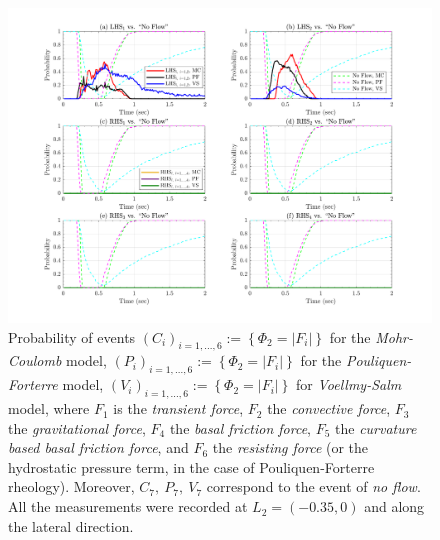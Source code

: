 \documentclass{article}
\begin{document}
\begin{figure}[H]
        \centering
        \includegraphics[width=1\textwidth]{InclinedPlane/LocalRecords/DominancePrY_L2.png}
        \caption{Probability of events $(C_i)_{i=1,...,6}:=\left\{\Phi_2=|F_i|\right\}$ for the \emph{Mohr-Coulomb} model, $(P_i)_{i=1,...,6}:=\left\{\Phi_2=|F_i|\right\}$ for the \emph{Pouliquen-Forterre} model, $(V_i)_{i=1,...,6}:=\left\{\Phi_2=|F_i|\right\}$ for \emph{Voellmy-Salm} model, where $F_1$ is the \emph{transient force}, $F_2$ the \emph{convective force}, $F_3$ the \emph{gravitational force}, $F_4$ the \emph{basal friction force}, $F_5$ the \emph{curvature based basal friction force}, and $F_6$ the \emph{resisting force} (or the hydrostatic pressure term, in the case of Pouliquen-Forterre rheology). Moreover, $C_7,\ P_7,\ V_7$ correspond to the event of \emph{no flow}. All the measurements were recorded at $L_2=(-0.35,0)$ and along the lateral direction.}
        \label{fig:Ramp-FYDominance-L2}
\end{figure}
\end{document}
